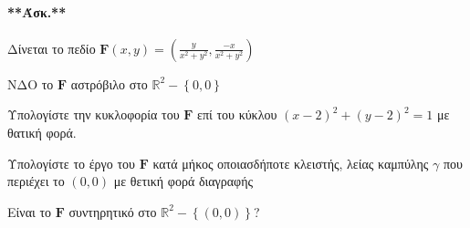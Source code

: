 \documentclass[11pt,a4paper,titlepage,draft]{article}
\begin{document}
\paragraph{**Άσκ.**}
Δίνεται το πεδίο \( \mathbf{F}(x,y) = \left(
\frac{y}{x^2+y^2},\frac{-x}{x^2+y^2}
\right) \)
\begin{enumparen}
\item ΝΔΟ το \( \mathbf F \) αστρόβιλο στο \( \mathbb R ^2 - \left\lbrace 0,0 \right\rbrace \)
\item Υπολογίστε την κυκλοφορία του \( \mathbf F \) επί του κύκλου \( (x-2)^2+(y-2)^2=1 \) με θατική φορά.
\item Υπολογίστε το έργο του \( \mathbf F \) κατά μήκος οποιασδήποτε κλειστής, λείας καμπύλης \( \gamma \) που περιέχει το \( (0,0) \) με θετική φορά διαγραφής
\item Είναι το \( \mathbf F \) συντηρητικό στο \( \mathbb R ^2 - \left\lbrace (0,0) \right\rbrace \)?
\end{enumparen}
\end{document}
